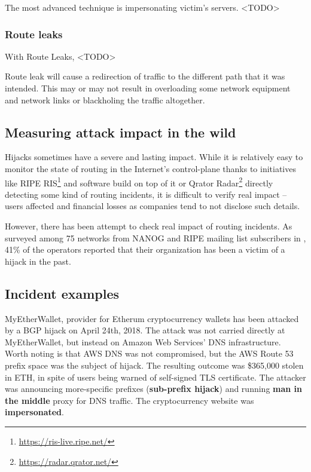 The most advanced technique is impersonating victim's servers. <TODO>


\subsubsection{Route leaks}
\label{def:impact:rl}
With Route Leaks, <TODO>

Route leak will cause a redirection of traffic to the different path that it was intended. This may or may not result in overloading some network equipment and network links or blackholing the traffic altogether. 

\subsection{Measuring attack impact in the wild}
\label{def:measurement}
Hijacks sometimes have a severe and lasting impact. While it is relatively easy to monitor the state of routing in the Internet's control-plane thanks to initiatives like RIPE RIS\footnote{\url{https://ris-live.ripe.net/}} and software build on top of it or Qrator Radar\footnote{\url{https://radar.qrator.net/}} directly detecting some kind of routing incidents, it is difficult to verify real impact -- users affected and financial losses as companies tend to not disclose such details. 

However, there has been attempt to check real impact of routing incidents. As surveyed among 75 networks from NANOG and RIPE mailing list subscribers in \cite{Sermpezis2018}, 41\% of the operators reported that their organization has been a victim of a hijack in the past. 





\subsection{Incident examples}

MyEtherWallet, provider for Etherum cryptocurrency wallets has been attacked by a BGP hijack on April 24th, 2018\cite{Brandom2018}. The attack was not carried directly at MyEtherWallet, but instead on Amazon Web Services' DNS infrastructure. Worth noting is that AWS DNS was not compromised, but the AWS Route 53 prefix space was the subject of hijack. The resulting outcome was \$365,000 stolen in ETH, in spite of users being warned of self-signed TLS certificate. The attacker was announcing more-specific prefixes (\textbf{sub-prefix hijack}) and running \textbf{man in the middle} proxy for DNS traffic. The cryptocurrency website was \textbf{impersonated}.

